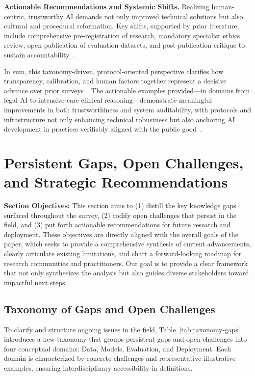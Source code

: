 \documentclass[sigconf]{acmart}
\begin{document}
\textbf{Actionable Recommendations and Systemic Shifts.} Realizing human-centric, trustworthy AI demands not only improved technical solutions but also cultural and procedural reformation. Key shifts, supported by prior literature, include comprehensive pre-registration of research, mandatory specialist ethics review, open publication of evaluation datasets, and post-publication critique to sustain accountability~\cite{ref40,ref53,ref52}. 

In sum, this taxonomy-driven, protocol-oriented perspective clarifies how transparency, calibration, and human factors together represent a decisive advance over prior surveys~\cite{ref52,ref55}. The actionable examples provided—in domains from legal AI to intensive-care clinical reasoning—demonstrate meaningful improvements in both trustworthiness and system auditability, with protocols and infrastructure not only enhancing technical robustness but also anchoring AI development in practices verifiably aligned with the public good~\cite{ref23,ref53,ref54,ref55}.

\section{Persistent Gaps, Open Challenges, and Strategic Recommendations}

\vspace{0.5em}
\textbf{Section Objectives:} This section aims to (1) distill the key knowledge gaps surfaced throughout the survey, (2) codify open challenges that persist in the field, and (3) put forth actionable recommendations for future research and deployment. These objectives are directly aligned with the overall goals of the paper, which seeks to provide a comprehensive synthesis of current advancements, clearly articulate existing limitations, and chart a forward-looking roadmap for research communities and practitioners. Our goal is to provide a clear framework that not only synthesizes the analysis but also guides diverse stakeholders toward impactful next steps.
\vspace{0.5em}

\subsection{Taxonomy of Gaps and Open Challenges}

To clarify and structure ongoing issues in the field, Table~\ref{tab:taxonomy-gaps} introduces a new taxonomy that groups persistent gaps and open challenges into four conceptual domains: Data, Models, Evaluation, and Deployment. Each domain is characterized by concrete challenges and representative illustrative examples, ensuring interdisciplinary accessibility in definitions.
\end{document}
